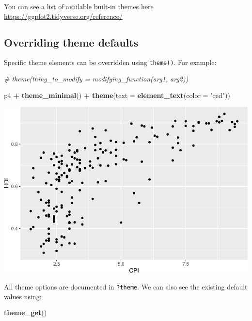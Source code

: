 \documentclass[
]{book}
\newenvironment{Shaded}{\begin{snugshade}}{\end{snugshade}}
\newcommand{\CommentTok}[1]{\textcolor[rgb]{0.56,0.35,0.01}{\textit{#1}}}
\newcommand{\DataTypeTok}[1]{\textcolor[rgb]{0.13,0.29,0.53}{#1}}
\newcommand{\KeywordTok}[1]{\textcolor[rgb]{0.13,0.29,0.53}{\textbf{#1}}}
\newcommand{\NormalTok}[1]{#1}
\newcommand{\OperatorTok}[1]{\textcolor[rgb]{0.81,0.36,0.00}{\textbf{#1}}}
\newcommand{\StringTok}[1]{\textcolor[rgb]{0.31,0.60,0.02}{#1}}
\begin{document}
You can see a list of available built-in themes here \url{https://ggplot2.tidyverse.org/reference/}

\hypertarget{overriding-theme-defaults}{%
\subsection{Overriding theme defaults}\label{overriding-theme-defaults}}

Specific theme elements can be overridden using \texttt{theme()}. For example:

\begin{Shaded}
\begin{Highlighting}[]
\CommentTok{\# theme(thing\_to\_modify = modifying\_function(arg1, arg2))}

\NormalTok{p4 }\OperatorTok{+}\StringTok{ }\KeywordTok{theme\_minimal}\NormalTok{() }\OperatorTok{+}
\StringTok{  }\KeywordTok{theme}\NormalTok{(}\DataTypeTok{text =} \KeywordTok{element\_text}\NormalTok{(}\DataTypeTok{color =} \StringTok{"red"}\NormalTok{))  }
\end{Highlighting}
\end{Shaded}

\includegraphics{R/Rgraphics/figures/unnamed-chunk-197-1.pdf}

All theme options are documented in \texttt{?theme}. We can also see the
existing default values using:

\begin{Shaded}
\begin{Highlighting}[]
\KeywordTok{theme\_get}\NormalTok{()}
\end{Highlighting}
\end{Shaded}
\end{document}
